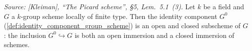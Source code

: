 
\begin{theorem}
  \label{thm:identity_component_open_subgroup}

  \textit{Source: [Kleiman], ``The Picard scheme'', \S 5, Lem.~5.1~(3).}
  Let \(k\) be a field and \(G\) a \(k\)-group scheme locally of finite
  type. Then the identity component \(G^0\)
  (\cref{def:identity_component_group_scheme}) is an open and closed
  subscheme of \(G\): the inclusion \(G^0 \hookrightarrow G\) is both an
  open immersion and a closed immersion of schemes.
\end{theorem}


